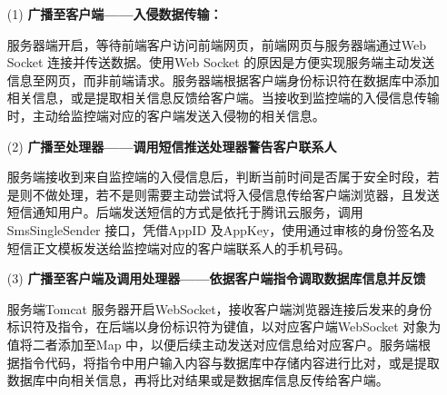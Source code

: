 \documentclass[article]{BJTU-thesis}
\begin{document}
\begin{enumerate}
	\item[(1)] \textbf{广播至客户端——入侵数据传输：}
	
	服务器端开启，等待前端客户访问前端网页，前端网页与服务器端通过Web Socket 连接并传送数据。使用Web Socket 的原因是方便实现服务端主动发送信息至网页，而非前端请求。服务器端根据客户端身份标识符在数据库中添加相关信息，或是提取相关信息反馈给客户端。当接收到监控端的入侵信息传输时，主动给监控端对应的客户端发送入侵物的相关信息。
	
	\item[(2)] \textbf{广播至处理器——调用短信推送处理器警告客户联系人}
	
	服务端接收到来自监控端的入侵信息后，判断当前时间是否属于安全时段，若是则不做处理，若不是则需要主动尝试将入侵信息传给客户端浏览器，且发送短信通知用户。后端发送短信的方式是依托于腾讯云服务，调用SmsSingleSender 接口，凭借AppID 及AppKey，使用通过审核的身份签名及短信正文模板发送给监控端对应的客户端联系人的手机号码。
	
	\item[(3)] \textbf{广播至客户端及调用处理器——依据客户端指令调取数据库信息并反馈}
	
	服务端Tomcat 服务器开启WebSocket，接收客户端浏览器连接后发来的身份标识符及指令，在后端以身份标识符为键值，以对应客户端WebSocket 对象为值将二者添加至Map 中，以便后续主动发送对应信息给对应客户。服务端根据指令代码，将指令中用户输入内容与数据库中存储内容进行比对，或是提取数据库中向相关信息，再将比对结果或是数据库信息反传给客户端。
\end{enumerate}
\end{document}
